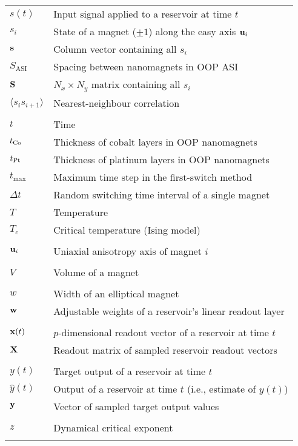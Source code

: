 \begin{longtable}[l]{p{60pt} p{350pt}}
	$s(t)$ & Input signal applied to a reservoir at time $t$ \\
	$s_i$ & State of a magnet ($\pm 1$) along the easy axis $\boldsymbol{\mathbf{u}}_i$ \\
	$\boldsymbol{\mathbf{s}}$ & Column vector containing all $s_i$ \\
	$S_\mathrm{ASI}$ & Spacing between nanomagnets in OOP ASI \\
	$\boldsymbol{\mathbf{S}}$ & $N_x \times N_y$ matrix containing all $s_i$ \\
	$\langle s_i s_{i+1} \rangle$ & Nearest-neighbour correlation \\
	&\\

	$t$ & Time \\
	$t_{\ce{Co}}$ & Thickness of cobalt layers in OOP nanomagnets \\
	$t_{\ce{Pt}}$ & Thickness of platinum layers in OOP nanomagnets \\
	$t_\mathrm{max}$ & Maximum time step in the first-switch method \\
	$\Delta t$ & Random switching time interval of a single magnet \\
	$T$ & Temperature \\
	$T_c$ & Critical temperature (Ising model) \\
	&\\

	$\boldsymbol{\mathbf{u}}_i$ & Uniaxial anisotropy axis of magnet $i$ \\
	&\\

	$V$ & Volume of a magnet \\
	&\\

	$w$ & Width of an elliptical magnet \\
	$\boldsymbol{\mathbf{w}}$ & Adjustable weights of a reservoir's linear readout layer \\
	&\\
	
	$\boldsymbol{\mathbf{x}}(t)$ & $p$-dimensional readout vector of a reservoir at time $t$ \\
	$\boldsymbol{\mathbf{X}}$ & Readout matrix of sampled reservoir readout vectors \\
	&\\
	
	$y(t)$ & Target output of a reservoir at time $t$ \\
	$\hat{y}(t)$ & Output of a reservoir at time $t$ (i.e., estimate of $y(t)$) \\
	$\boldsymbol{\mathbf{y}}$ & Vector of sampled target output values \\
	&\\
	
	$z$ & Dynamical critical exponent \\
	&\\
\end{longtable}

